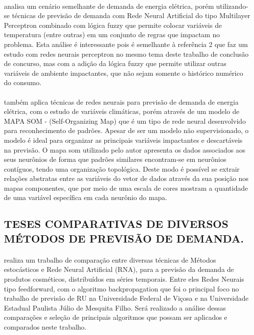 \documentclass[	12pt, Times, openright, twoside, a4paper, english, brazil]{abntex2}
\begin{document}
        \paragraph*{} \cite{Almeida2013} analisa um cenário semelhante de demanda de energia elétrica, porém utilizando-se técnicas de previsão de demanda com Rede Neural Artificial do tipo Multilayer Perceptron combinado com lógica fuzzy que permite colocar variáveis de temperatura (entre outras) em um conjunto de regras que impactam no problema. Esta análise é interessante pois é semelhante à referência 2 que faz um estudo com redes neurais perceptron no mesmo tema deste trabalho de conclusão de concurso, mas com a adição da lógica fuzzy que permite utilizar outras variáveis de ambiente impactantes, que não sejam somente o histórico numérico do consumo.
        
        \paragraph*{} \cite{Silva2010} também aplica técnicas de redes neurais para previsão de demanda de energia elétrica, com o estudo de variáveis climáticas, porém através de um modelo de MAPA SOM - (Self-Organizing Map) que é um tipo de rede neural desenvolvido para reconhecimento de padrões. Apesar de ser um modelo não supervisionado, o modelo é ideal para organizar as principais variáveis impactantes e descartáveis na previsão. O mapa som utilizado pelo autor apresenta os dados associados aos seus neurônios de forma que padrões similares encontram-se em neurônios contíguos, tendo uma organização topológica. Deste modo é possível se extrair relações abstratas entre as variáveis do vetor de dados através da sua posição nos mapas componentes, que por meio de uma escala de cores mostram a quantidade de uma variável específica em cada neurônio do mapa.
       
       \subsection{TESES COMPARATIVAS DE DIVERSOS MÉTODOS DE PREVISÃO DE DEMANDA.}
        \paragraph*{} \cite{Junior2007} realiza um trabalho de comparação entre diversas técnicas de Métodos estocásticos e Rede Neural Artificial (RNA), para a previsão da demanda de produtos cosméticos, distribuídos em séries temporais. Entre eles Redes Neurais tipo feedforward, com o algoritmo backpropagation que foi o principal foco no trabalho de previsão de RU na Universidade Federal de Viçosa e na Universidade Estadual Paulista Júlio de Mesquita Filho. Será realizado a análise dessas comparações e seleção de principais algoritmos que possam ser aplicados e comparados neste trabalho.
        
\end{document}
